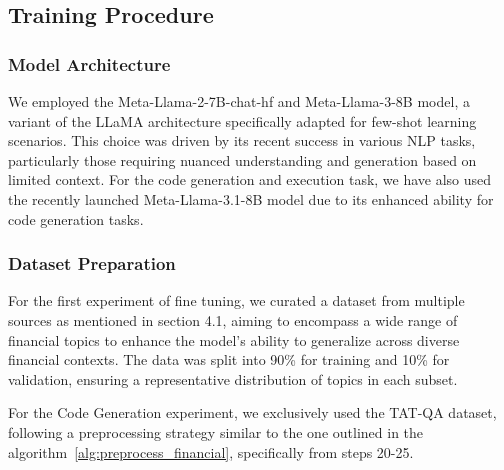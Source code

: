 \documentclass[logo,msc]{infthesis}           %
\begin{document}
\subsection{Training Procedure}
\subsubsection*{Model Architecture} We employed the Meta-Llama-2-7B-chat-hf and Meta-Llama-3-8B model, a variant of the LLaMA architecture specifically adapted for few-shot learning scenarios. This choice was driven by its recent success in various NLP tasks, particularly those requiring nuanced understanding and generation based on limited context. For the code generation and execution task, we have also used the recently launched Meta-Llama-3.1-8B model due to its enhanced ability for code generation tasks.

\subsubsection*{Dataset Preparation} For the first experiment of fine tuning, we curated a dataset from multiple sources as mentioned in section 4.1, aiming to encompass a wide range of financial topics to enhance the model's ability to generalize across diverse financial contexts. The data was split into 90\% for training and 10\% for validation, ensuring a representative distribution of topics in each subset.

For the Code Generation experiment, we exclusively used the TAT-QA dataset, following a preprocessing strategy similar to the one outlined in the algorithm~\ref{alg:preprocess_financial}, specifically from steps 20-25.
\end{document}
